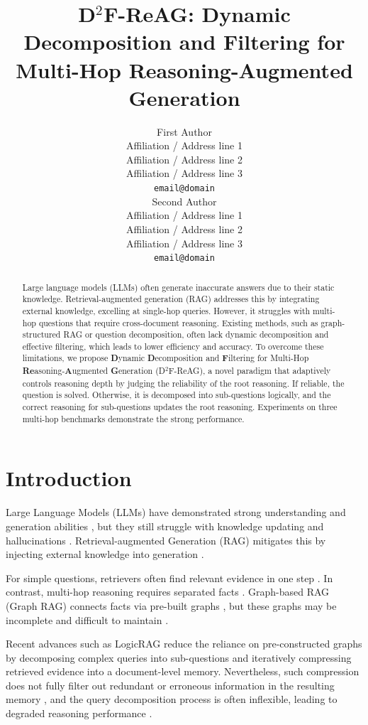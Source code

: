 \documentclass[11pt]{article}
\title{D$^2$F-ReAG: Dynamic Decomposition and Filtering for Multi-Hop Reasoning-Augmented Generation}
\author{First Author \\
  Affiliation / Address line 1 \\
  Affiliation / Address line 2 \\
  Affiliation / Address line 3 \\
  \texttt{email@domain} \\\And
  Second Author \\
  Affiliation / Address line 1 \\
  Affiliation / Address line 2 \\
  Affiliation / Address line 3 \\
  \texttt{email@domain} \\}
\begin{document}
\maketitle
\begin{abstract}
Large language models (LLMs) often generate inaccurate answers due to their static knowledge. Retrieval-augmented generation (RAG) addresses this by integrating external knowledge, excelling at single-hop queries. However, it struggles with multi-hop questions that require cross-document reasoning. Existing methods, such as graph-structured RAG or question decomposition, often lack dynamic decomposition and effective filtering, which leads to lower efficiency and accuracy. To overcome these limitations, we propose \textbf{D}ynamic \textbf{D}ecomposition and \textbf{F}iltering for Multi-Hop \textbf{Re}asoning-\textbf{A}ugmented \textbf{G}eneration (D$^2$F-ReAG), a novel paradigm that adaptively controls reasoning depth by judging the reliability of the root reasoning. If reliable, the question is solved. Otherwise, it is decomposed into sub-questions logically, and the correct reasoning for sub-questions updates the root reasoning. Experiments on three multi-hop benchmarks demonstrate the strong performance.
\end{abstract}

\section{Introduction}
Large Language Models (LLMs) have demonstrated strong understanding and generation abilities \cite{achiam2023gpt}, but they still struggle with knowledge updating and hallucinations \cite{jiang-etal-2024-large}. Retrieval-augmented Generation (RAG) mitigates this by injecting external knowledge into generation \cite{lewis2020retrieval}.

For simple questions, retrievers often find relevant evidence in one step \cite{shi-etal-2024-generate}. In contrast, multi-hop reasoning requires separated facts \cite{cheng-etal-2025-dualrag}. Graph-based RAG (Graph RAG) connects facts via pre-built graphs \cite{edge2024local}, but these graphs may be incomplete and difficult to maintain \cite{li2025subqrag}.

Recent advances such as LogicRAG \cite{chen2025you} reduce the reliance on pre-constructed graphs by decomposing complex queries into sub-questions and iteratively compressing retrieved evidence into a document-level memory. Nevertheless, such compression does not fully filter out redundant or erroneous information in the resulting memory \cite{zhuang-etal-2024-efficientrag}, and the query decomposition process is often inflexible, leading to degraded reasoning performance \cite{kim-etal-2025-unirag}.
\end{document}
